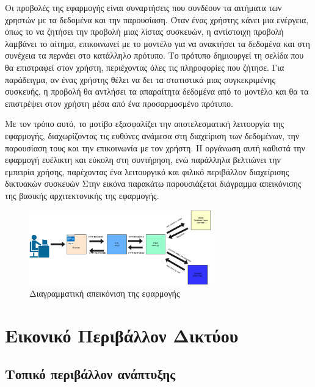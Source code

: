 Οι προβολές της εφαρμογής είναι συναρτήσεις  που συνδέουν 
τα αιτήματα των χρηστών με τα δεδομένα και την παρουσίαση. 
Όταν ένας χρήστης κάνει μια ενέργεια, όπως το να ζητήσει την προβολή 
μιας λίστας συσκευών, η αντίστοιχη προβολή λαμβάνει το αίτημα, 
επικοινωνεί με το μοντέλο για να ανακτήσει τα δεδομένα και στη 
συνέχεια τα περνάει στο κατάλληλο πρότυπο. 
Το πρότυπο δημιουργεί τη σελίδα  που θα επιστραφεί στον χρήστη, περιέχοντας όλες τις πληροφορίες που ζήτησε. Για παράδειγμα, αν ένας χρήστης θέλει να δει τα στατιστικά μιας συγκεκριμένης συσκευής, η προβολή θα αντλήσει τα απαραίτητα δεδομένα από το μοντέλο και θα τα επιστρέψει στον χρήστη μέσα από ένα προσαρμοσμένο πρότυπο.

Με τον τρόπο αυτό, το μοτίβο  εξασφαλίζει την αποτελεσματική 
λειτουργία της εφαρμογής, διαχωρίζοντας τις ευθύνες ανάμεσα στη 
διαχείριση των δεδομένων, την παρουσίαση τους και την επικοινωνία με τον χρήστη. Η οργάνωση αυτή καθιστά την εφαρμογή ευέλικτη και εύκολη στη συντήρηση, ενώ παράλληλα βελτιώνει την εμπειρία χρήσης, παρέχοντας ένα λειτουργικό και φιλικό περιβάλλον διαχείρισης δικτυακών συσκευών
Στην εικόνα παρακάτω παρουσιάζεται διάγραμμα απεικόνισης της βασικής αρχιτεκτονικής της εφαρμογής.

\begin{figure}[h]
	\centering
	\includegraphics[width=0.7\textwidth]{graphics/MTV.drawio.png}
	\caption{Διαγραμματική απεικόνιση της εφαρμογής}
\end{figure}



\section{Εικονικό Περιβάλλον Δικτύου }

\subsection{Τοπικό περιβάλλον ανάπτυξης}

